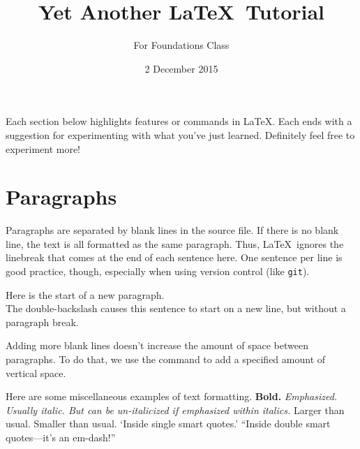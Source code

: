 \documentclass{article}
\title{Yet Another \LaTeX\ Tutorial}
\author{For Foundations Class}
\date{2 December 2015}
\begin{document}

\maketitle


Each section below highlights features or commands in \LaTeX.
Each ends with a suggestion for experimenting with what you've just learned.
Definitely feel free to experiment more!

\section{Paragraphs}
\label{sec:paragraphs}

Paragraphs are separated by blank lines in the source file.
If there is no blank line, the text is all formatted as the same paragraph.
Thus, \LaTeX\ ignores the linebreak that comes at the end of each sentence here.
One sentence per line is good practice, though, especially when using version control (like \texttt{git}).

Here is the start of a new paragraph.  \\
The double-backslash causes this sentence to start on a new line, but without a paragraph break.

\vspace{20pt}
Adding more blank lines doesn't increase the amount of space between paragraphs.
To do that, we use the \latexcode{\\vspace} command to add a specified amount of vertical space.

Here are some miscellaneous examples of text formatting.
\textbf{Bold.}
\emph{Emphasized.  Usually italic.  But can be un-italicized if \emph{emphasized} within italics.}
\large{Larger than usual.}
\small{Smaller than usual.}
`Inside single smart quotes.'
``Inside double smart quotes---it's an em-dash!''

\subsection{\task}
\end{document}
